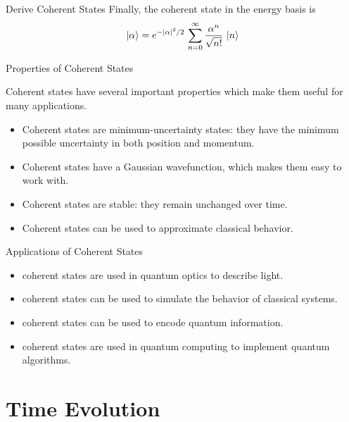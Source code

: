 \documentclass{loyola-beamer}
\begin{document}
\begin{frame}{Derive Coherent States}
	Finally, the coherent state in the energy basis is
	\begin{align*}
		\ket{\alpha} = e^{-|\alpha|^2/2}\,
		\sum_{n=0}^\infty \frac{\alpha^n}{\sqrt{n!}} \, \ket{n}
	\end{align*}

\end{frame}

\begin{frame}{Properties of Coherent States}

	Coherent states have several important properties which make them useful for many applications.

	\begin{itemize}
		\item Coherent states are minimum-uncertainty states: they have the minimum possible uncertainty in both position and momentum.
		\item Coherent states have a Gaussian wavefunction, which makes them easy to work with.
		\item Coherent states are stable: they remain unchanged over time.
		\item Coherent states can be used to approximate classical behavior.
	\end{itemize}

\end{frame}

\begin{frame}{Applications of Coherent States}

	\begin{itemize}
		\item coherent states are used in quantum optics to describe light.
		\item coherent states can be used to simulate the behavior of classical systems.
		\item coherent states can be used to encode quantum information.
		\item coherent states are used in quantum computing to implement quantum algorithms.
	\end{itemize}

\end{frame}

\section{Time Evolution}
\end{document}
